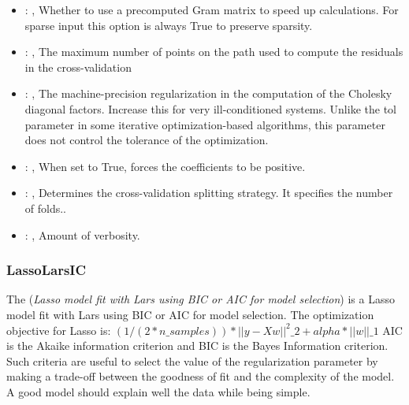 \begin{itemize}
    \item {}: , 
      Whether to use a precomputed Gram matrix to speed up calculations.
      For sparse input this option is always True to preserve sparsity.

    \item {}: , 
      The maximum number of points on the path used to compute the residuals in
      the cross-validation

    \item {}: , 
      The machine-precision regularization in the computation of the Cholesky
      diagonal factors. Increase this for very ill-conditioned systems. Unlike the tol
      parameter in some iterative optimization-based algorithms, this parameter does not
      control the tolerance of the optimization.

    \item {}: , 
      When set to True, forces the coefficients to be positive.

    \item {}: , 
      Determines the cross-validation splitting strategy.
      It specifies the number of folds..

    \item {}: , 
      Amount of verbosity.
  \end{itemize}


\subsubsection{LassoLarsIC}
  The  (\textit{Lasso model fit with Lars using BIC or AIC for model
  selection})                         is a Lasso model fit with Lars using BIC or AIC for model
  selection.                         The optimization objective for Lasso is:
  $(1 / (2 * n\_samples)) * ||y - Xw||^2\_2 + alpha * ||w||\_1$                         AIC is the
  Akaike information criterion and BIC is the Bayes Information criterion. Such criteria
  are useful to select the value of the regularization parameter by making a trade-off between the
  goodness of fit and the complexity of the model. A good model should explain well the data
  while being simple.                         

